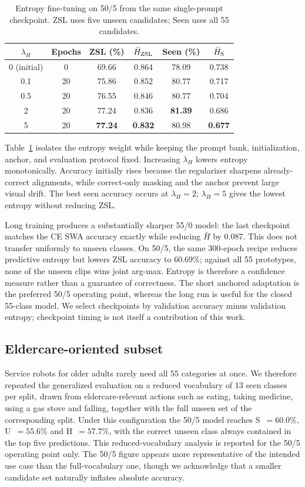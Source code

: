 \documentclass[conference]{IEEEtran}
\begin{document}
\begin{table}[t]
\centering
\caption{Entropy fine-tuning on 50/5 from the same single-prompt checkpoint.
ZSL uses five unseen candidates; Seen uses all 55 candidates.}
\label{tab:entropy_ft}
\scriptsize
\begin{tabular}{cccccc}
\hline
$\lambda_H$ & Epochs & ZSL (\%) & $\bar H_{\rm ZSL}$ & Seen (\%) & $\bar H_{\rm S}$ \\
\hline
0 (initial) & 0  & 69.66 & 0.864 & 78.09 & 0.738 \\
0.1         & 20 & 75.86 & 0.852 & 80.77 & 0.717 \\
0.5         & 20 & 76.55 & 0.846 & 80.77 & 0.704 \\
2           & 20 & 77.24 & 0.836 & \textbf{81.39} & 0.686 \\
5           & 20 & \textbf{77.24} & \textbf{0.832} & 80.98 & \textbf{0.677} \\
\hline
\end{tabular}
\end{table}

Table~\ref{tab:entropy_ft} isolates the entropy weight while keeping the prompt
bank, initialization, anchor, and evaluation protocol fixed. Increasing
$\lambda_H$ lowers entropy monotonically. Accuracy initially rises because the
regularizer sharpens already-correct alignments, while correct-only masking and
the anchor prevent large visual drift. The best seen accuracy occurs at
$\lambda_H=2$; $\lambda_H=5$ gives the lowest entropy without reducing ZSL.

Long training produces a substantially sharper 55/0 model: the last checkpoint
matches the CE SWA accuracy exactly while reducing $\bar H$ by 0.087. This does
not transfer uniformly to unseen classes. On 50/5, the same 300-epoch recipe
reduces predictive entropy but lowers ZSL accuracy to 60.69\%; against all 55 prototypes,
none of the unseen clips wins joint arg-max. Entropy is therefore a confidence
measure rather than a guarantee of correctness. The short anchored adaptation
is the preferred 50/5 operating point, whereas the long run is useful for the
closed 55-class model. We select checkpoints by validation accuracy minus
validation entropy; checkpoint timing is not itself a contribution of this work.

\subsection{Eldercare-oriented subset}
Service robots for older adults rarely need all 55 categories at once. We
therefore repeated the generalized evaluation on a reduced vocabulary of 13
seen classes per split, drawn from eldercare-relevant actions such as eating,
taking medicine, using a gas stove and falling, together with the full unseen
set of the corresponding split. Under this configuration the 50/5 model
reaches S~$=60.0\%$, U~$=55.6\%$ and H~$=57.7\%$, with the correct unseen
class always contained in the top five predictions. This reduced-vocabulary
analysis is reported for the 50/5 operating point only. The 50/5 figure appears
more representative of the intended use case than the
full-vocabulary one, though
we acknowledge that a smaller candidate set naturally inflates absolute
accuracy.
\end{document}
